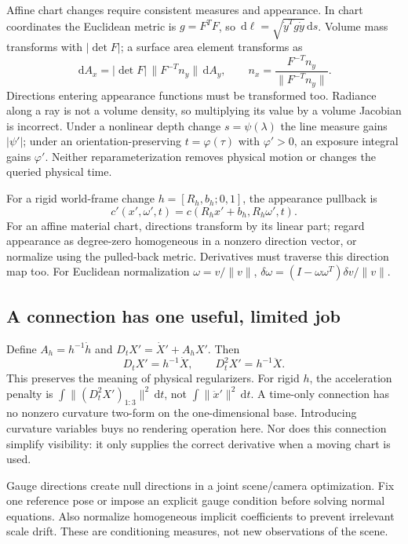 \documentclass[10pt,letterpaper]{article}
\theoremstyle{remark}\newtheorem{counterexample}[proposition]{Counterexample}
\newcommand{\dd}{\,\mathrm d}
\begin{document}
Affine chart changes require consistent measures and appearance. In chart coordinates the Euclidean metric is $g=F^TF$, so $\dd\ell=\sqrt{\dot y^Tg\dot y}\dd s$. Volume mass transforms with $|\det F|$; a surface area element transforms as
\begin{equation}
 \dd A_x=|\det F|\,\|F^{-T}n_y\|\dd A_y,\qquad
 n_x=\frac{F^{-T}n_y}{\|F^{-T}n_y\|}.
\end{equation}
Directions entering appearance functions must be transformed too. Radiance along a ray is not a volume density, so multiplying its value by a volume Jacobian is incorrect. Under a nonlinear depth change $s=\psi(\lambda)$ the line measure gains $|\psi'|$; under an orientation-preserving $t=\varphi(\tau)$ with $\varphi'>0$, an exposure integral gains $\varphi'$. Neither reparameterization removes physical motion or changes the queried physical time.

For a rigid world-frame change $h=[R_h,b_h;0,1]$, the appearance pullback is
\begin{equation}
 c'(x',\omega',t)=c(R_hx'+b_h,R_h\omega',t).
\end{equation}
For an affine material chart, directions transform by its linear part; regard appearance as degree-zero homogeneous in a nonzero direction vector, or normalize using the pulled-back metric. Derivatives must traverse this direction map too. For Euclidean normalization $\omega=v/\|v\|$, $\delta\omega=(I-\omega\omega^T)\delta v/\|v\|$.

\subsection{A connection has one useful, limited job}
Define $A_h=h^{-1}\dot h$ and $D_tX'=\dot X'+A_hX'$. Then
\begin{equation}
 D_tX'=h^{-1}\dot X,\qquad D_t^2X'=h^{-1}\ddot X.
\end{equation}
This preserves the meaning of physical regularizers. For rigid $h$, the acceleration penalty is $\int\|(D_t^2X')_{1:3}\|^2\dd t$, not $\int\|\ddot x'\|^2\dd t$. A time-only connection has no nonzero curvature two-form on the one-dimensional base. Introducing curvature variables buys no rendering operation here. Nor does this connection simplify visibility: it only supplies the correct derivative when a moving chart is used.

Gauge directions create null directions in a joint scene/camera optimization. Fix one reference pose or impose an explicit gauge condition before solving normal equations. Also normalize homogeneous implicit coefficients to prevent irrelevant scale drift. These are conditioning measures, not new observations of the scene.
\end{document}
